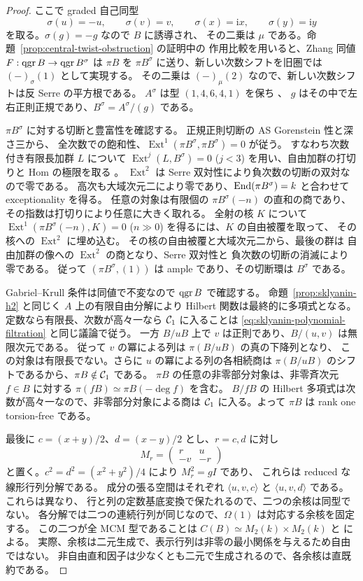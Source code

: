 \begin{proof}
ここで graded 自己同型
\[
 \sigma(u)=-u,\qquad \sigma(v)=v,\qquad
 \sigma(x)=\mathrm i x,\qquad \sigma(y)=\mathrm i y
\]
を取る。$\sigma(g)=-g$ なので $B$ に誘導され、
その二乗は $\mu$ である。命題~\ref{prop:central-twist-obstruction} の証明中の
作用比較を用いると、Zhang 同値 $F:\operatorname{qgr} B\to\operatorname{qgr} B^\sigma$ は $\pi B$ を
$\pi B^\sigma$ に送り、新しい次数シフトを旧圏では $(-)_\sigma(1)$ として実現する。
その二乗は $(-)_\mu(2)$ なので、新しい次数シフトは反 Serre の平方根である。
$A^\sigma$ は型 $(1,4,6,4,1)$ を保ち \cite[Lemma 4.1]{MUW2026}、
$g$ はその中で左右正則正規であり、$B^\sigma=A^\sigma/(g)$ である。

$\pi B^\sigma$ に対する切断と豊富性を確認する。
正規正則切断の AS Gorenstein 性と深さ三から、
全次数での飽和性、$\operatorname{Ext}^1(\pi B^\sigma,\pi B^\sigma)=0$ が従う。
すなわち次数付き有限長加群 $L$ について $\operatorname{Ext}^j(L,B^\sigma)=0$
($j<3$) を用い、自由加群の打切りと Hom の極限を取る
\cite[Lemma 5.9(1)--(2)]{MU2021}。
$\operatorname{Ext}^2$ は Serre 双対性により負次数の切断の双対なので零である。
高次も大域次元二により零であり、$\operatorname{End}(\pi B^\sigma)=k$ と合わせて exceptionality を得る。
任意の対象は有限個の $\pi B^\sigma(-n)$ の直和の商であり、
その指数は打切りにより任意に大きく取れる。
全射の核 $K$ について $\operatorname{Ext}^1(\pi B^\sigma(-n),K)=0$
($n\gg0$) を得るには、$K$ の自由被覆を取って、
その核への $\operatorname{Ext}^2$ に埋め込む。
その核の自由被覆と大域次元二から、最後の群は
自由加群の像への $\operatorname{Ext}^2$ の商となり、Serre 双対性と
負次数の切断の消滅により零である。
従って $(\pi B^\sigma,(1))$ は ample であり、その切断環は $B^\sigma$ である。

Gabriel--Krull 条件は同値で不変なので $\operatorname{qgr} B$ で確認する。
命題~\ref{prop:sklyanin-h2} と同じく $A$ 上の有限自由分解により
Hilbert 関数は最終的に多項式となる。定数なら有限長、次数が高々一なら
$\mathcal C_1$ に入ることは \eqref{eq:sklyanin-polynomial-filtration} と同じ議論で従う。
一方 $B/uB$ 上で $v$ は正則であり、$B/(u,v)$ は無限次元である。
従って $v$ の冪による列は $\pi(B/uB)$ の真の下降列となり、
この対象は有限長でない。さらに $u$ の冪による列の各相続商は
$\pi(B/uB)$ のシフトであるから、$\pi B\notin\mathcal C_1$ である。
$\pi B$ の任意の非零部分対象は、非零斉次元 $f\in B$ に対する
$\pi(fB)\simeq\pi B(-\deg f)$ を含む。
$B/fB$ の Hilbert 多項式は次数が高々一なので、非零部分対象による商は
$\mathcal C_1$ に入る。よって $\pi B$ は rank one torsion-free である。

最後に $c=(x+y)/2$、$d=(x-y)/2$ とし、$r=c,d$ に対し
\[
 M_r=\begin{pmatrix}r&u\\ -v&-r\end{pmatrix}
\]
と置く。$c^2=d^2=(x^2+y^2)/4$ により $M_r^2=gI$ であり、
これらは reduced な線形行列分解である。
成分の張る空間はそれぞれ $\langle u,v,c\rangle$ と
$\langle u,v,d\rangle$ である。これらは異なり、
行と列の定数基底変換で保たれるので、二つの余核は同型でない。
各分解では二つの連続行列が同じなので、$\Omega(1)$ は対応する余核を固定する。
この二つが全 MCM 型であることは $C(B)\simeq M_2(k)\times M_2(k)$ と
\cite[Lemma 4.13(4)--(5)]{MU2022} による。
実際、余核は二元生成で、表示行列は非零の最小関係を与えるため自由ではない。
非自由直和因子は少なくとも二元で生成されるので、各余核は直既約である。


\end{proof}
